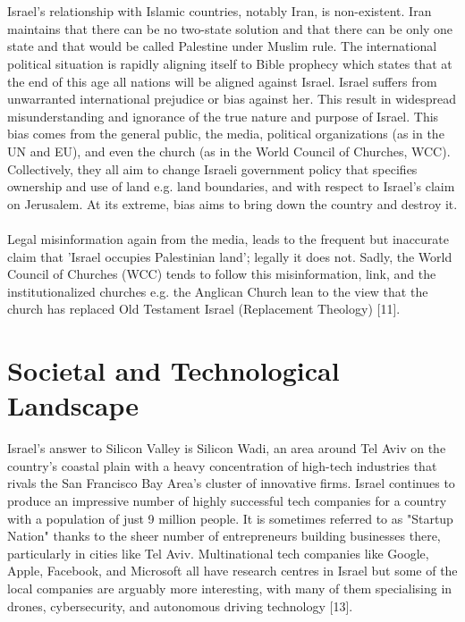 \documentclass[10pt]{article}
\begin{document}
\\
\\
Israel’s relationship with Islamic countries, notably Iran, is non-existent. Iran maintains that there can be no two-state solution and that there can be only one state and that would be called Palestine under Muslim rule. The international political situation is rapidly aligning itself to Bible prophecy which states that at the end of this age all nations will be aligned against Israel. Israel suffers from unwarranted international prejudice or bias against her. This result in widespread misunderstanding and ignorance of the true nature and purpose of Israel. This bias comes from the general public, the media, political organizations (as in the UN and EU), and even the church (as in the World Council of Churches, WCC). Collectively, they all aim to change Israeli government policy that specifies ownership and use of land e.g. land boundaries, and with respect to Israel’s claim on Jerusalem. At its extreme, bias aims to bring down the country and destroy it.
\\
\\
Legal misinformation again from the media, leads to the frequent but inaccurate claim that 'Israel occupies Palestinian land'; legally it does not. Sadly, the World Council of Churches (WCC) tends to follow this misinformation, link, and the institutionalized churches e.g. the Anglican Church lean to the view that the church has replaced Old Testament Israel (Replacement Theology) [11].

\section{Societal and Technological Landscape}
Israel’s answer to Silicon Valley is Silicon Wadi, an area around Tel Aviv on the country's coastal plain with a heavy concentration of high-tech industries that rivals the San Francisco Bay Area’s cluster of innovative firms. Israel continues to produce an impressive number of highly successful tech companies for a country with a population of just 9 million people. It is sometimes referred to as "Startup Nation" thanks to the sheer number of entrepreneurs building businesses there, particularly in cities like Tel Aviv. Multinational tech companies like Google, Apple, Facebook, and Microsoft all have research centres in Israel but some of the local companies are arguably more interesting, with many of them specialising in drones, cybersecurity, and autonomous driving technology [13].
\end{document}
